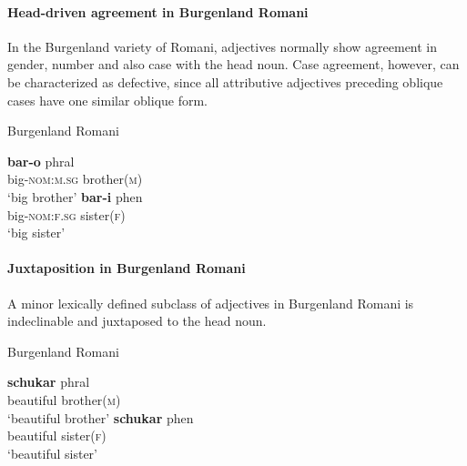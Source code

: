 \paragraph*{Head\hyp{}driven agreement in Burgenland Romani}
\label{romani synchr}
In the Burgenland variety of Romani, adjectives normally show agreement in gender, number and also case with the head noun. Case agreement, however, can be characterized as defective, since all attributive adjectives preceding oblique cases have one similar oblique form.
\begin{exe}
\ex \rm{Burgenland Romani \citep[22–23]{halwachs-etal2002}}
\begin{xlist} 
\ex 
\gll	\textbf{bar-o} phral\\
	big-\textsc{nom:m.sg} brother(\textsc{m})\\
\glt	‘big brother’
\ex
\gll	\textbf{bar-i} phen\\
	big-\textsc{nom:f.sg} sister(\textsc{f})\\
\glt	‘big sister’
\end{xlist}
\end{exe}

\paragraph*{Juxtaposition in Burgenland Romani}
A minor lexically defined subclass of adjectives in Burgenland Romani is indeclinable and juxtaposed to the head noun.
\begin{exe}
\ex \rm{Burgenland Romani \citep[22–23]{halwachs-etal2002}}
\begin{xlist}
\ex 
\gll	\textbf{schukar} phral\\
	beautiful brother(\textsc{m})\\
\glt	‘beautiful brother’
\ex
\gll	\textbf{schukar} phen\\
	beautiful sister(\textsc{f})\\
\glt	‘beautiful sister’
\end{xlist}
\end{exe}

